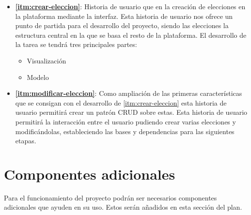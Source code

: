 \documentclass{article}
\begin{document}
            \begin{itemize}
            	\item \textbf{\ref{itm:crear-eleccion}}: Historia de usuario que en la creación de elecciones en la plataforma mediante la interfaz. Esta historia de usuario nos ofrece un punto de partida para el desarrollo del proyecto, siendo las elecciones la estructura central en la que se basa el resto de la plataforma. \newline El desarrollo de la tarea se tendrá tres principales partes:\begin{itemize}
            	\item Visualización
                \item Modelo
                
            	\end{itemize}

            	\item \textbf{\ref{itm:modificar-eleccion}}: Como ampliación de las primeras características que se consigan con el desarrollo de \ref{itm:crear-eleccion} esta historia de usuario permitirá crear un patrón CRUD sobre estas. \newline Esta historia de usuario permitirá la interacción entre el usuario pudiendo crear varias elecciones y modificándolas, estableciendo las bases y dependencias para las siguientes etapas.

            \end{itemize}

	\clearpage
	\section{Componentes adicionales}
	    
        \paragraph{}
        Para el funcionamiento del proyecto podrán ser necesarios componentes adicionales que ayuden en su uso. Estos serán añadidos en esta sección del plan.
	\newpage
    \thispagestyle{fancy}
    \printindex
\end{document}

